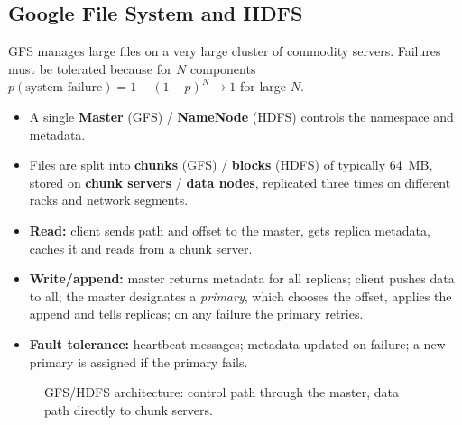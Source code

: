 \subsection{Google File System and HDFS}
GFS manages large files on a very large cluster of commodity servers. Failures must be tolerated because for $N$
components $p(\text{system failure}) = 1 - (1 - p)^N \to 1$ for large $N$.
\begin{itemize}[leftmargin=*]
  \item A single \textbf{Master} (GFS) / \textbf{NameNode} (HDFS) controls the namespace and metadata.
  \item Files are split into \textbf{chunks} (GFS) / \textbf{blocks} (HDFS) of typically 64~MB, stored on \textbf{chunk servers} /
        \textbf{data nodes}, replicated three times on different racks and network segments.
  \item \textbf{Read:} client sends path and offset to the master, gets replica metadata, caches it and reads from a chunk
        server.
  \item \textbf{Write/append:} master returns metadata for all replicas; client pushes data to all; the master designates a
        \emph{primary}, which chooses the offset, applies the append and tells replicas; on any failure the primary retries.
  \item \textbf{Fault tolerance:} heartbeat messages; metadata updated on failure; a new primary is assigned if the primary fails.
\end{itemize}

\begin{figure}[H]
\centering
{}
\caption{GFS/HDFS architecture: control path through the master, data path directly to chunk servers.}
\end{figure}

